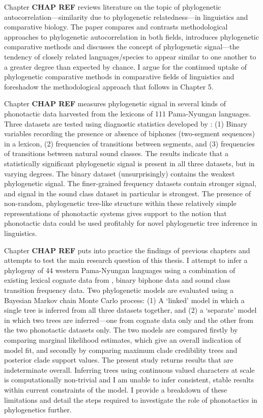Chapter \textbf{CHAP REF} reviews literature on the topic of phylogenetic autocorrelation---similarity due to phylogenetic relatedness---in linguistics and comparative biology. The paper compares and contrasts methodological approaches to phylogenetic autocorrelation in both fields, introduces phylogenetic comparative methods and discusses the concept of phylogenetic signal---the tendency of closely related languages/species to appear similar to one another to a greater degree than expected by chance. I argue for the continued uptake of phylogenetic comparative methods in comparative fields of linguistics and foreshadow the methodological approach that follows in Chapter 5.

Chapter \textbf{CHAP REF} measures phylogenetic signal in several kinds of phonotactic data harvested from the lexicons of 111 Pama-Nyungan languages. Three datasets are tested using diagnostic statistics developed by \textcite{blomberg_testing_2003}: (1) Binary variables recording the presence or absence of biphones (two-segment sequences) in a lexicon, (2) frequencies of transitions between segments, and (3) frequencies of transitions between natural sound classes. The results indicate that a statistically significant phylogenetic signal is present in all three datasets, but in varying degrees. The binary dataset (unsurprisingly) contains the weakest phylogenetic signal. The finer-grained frequency datasets contain stronger signal, and signal in the sound class dataset in particular is strongest. The presence of non-random, phylogenetic tree-like structure within these relatively simple representations of phonotactic systems gives support to the notion that phonotactic data could be used profitably for novel phylogenetic tree inference in linguistics.

Chapter \textbf{CHAP REF} puts into practice the findings of previous chapters and attempts to test the main research question of this thesis. I attempt to infer a phylogeny of 44 western Pama-Nyungan languages using a combination of existing lexical cognate data from \textcite{bouckaert_origin_2018}, binary biphone data and sound class transition frequency data. Two phylogenetic models are evaluated using a Bayesian Markov chain Monte Carlo process: (1) A `linked' model in which a single tree is inferred from all three datasets together, and (2) a `separate' model in which two trees are inferred---one from cognate data only and the other from the two phonotactic datasets only. The two models are compared firstly by comparing marginal likelihood estimates, which give an overall indication of model fit, and secondly by comparing maximum clade credibility trees and posterior clade support values. The present study returns results that are indeterminate overall. Inferring trees using continuous valued characters at scale is computationally non-trivial and I am unable to infer consistent, stable results within current constraints of the model. I provide a breakdown of these limitations and detail the steps required to investigate the role of phonotactics in phylogenetics further.

